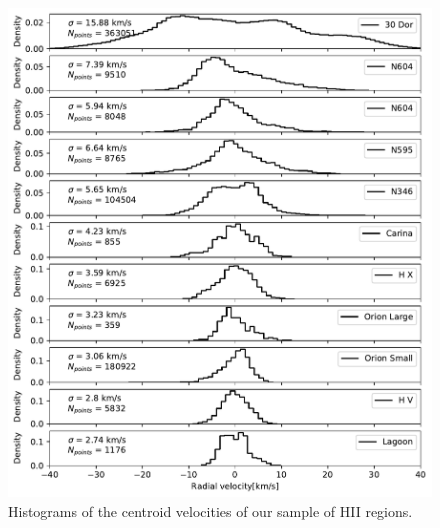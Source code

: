 \documentclass[fleqn,usenatbib, useAMS, a4paper]{mnras}
\begin{document}

\begin{figure}
 \centering
 \includegraphics[width=5in]{Figures/Hist/Hist}\par
 \caption{Histograms of the centroid velocities of our sample of HII regions. }
 \label{fig:hist}
\end{figure}
\end{document}
